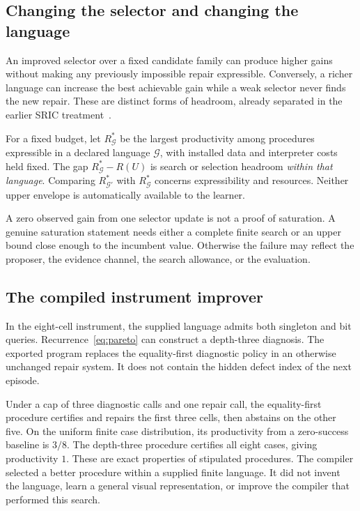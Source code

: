 \documentclass[11pt,letterpaper]{article}
\theoremstyle{plain}
\theoremstyle{definition}
\begin{document}
\subsection{Changing the selector and changing the language}
An improved selector over a fixed candidate family can produce higher gains without making any previously impossible repair expressible. Conversely, a richer language can increase the best achievable gain while a weak selector never finds the new repair. These are distinct forms of headroom, already separated in the earlier SRIC treatment~\cite{sric}.

For a fixed budget, let $R^*_{\mathcal G}$ be the largest productivity among procedures expressible in a declared language $\mathcal G$, with installed data and interpreter costs held fixed. The gap $R^*_{\mathcal G}-R(U)$ is search or selection headroom \emph{within that language}. Comparing $R^*_{\mathcal G'}$ with $R^*_{\mathcal G}$ concerns expressibility and resources. Neither upper envelope is automatically available to the learner.

A zero observed gain from one selector update is not a proof of saturation. A genuine saturation statement needs either a complete finite search or an upper bound close enough to the incumbent value. Otherwise the failure may reflect the proposer, the evidence channel, the search allowance, or the evaluation.

\subsection{The compiled instrument improver}
In the eight-cell instrument, the supplied language admits both singleton and bit queries. Recurrence~\eqref{eq:pareto} can construct a depth-three diagnosis. The exported program replaces the equality-first diagnostic policy in an otherwise unchanged repair system. It does not contain the hidden defect index of the next episode.

Under a cap of three diagnostic calls and one repair call, the equality-first procedure certifies and repairs the first three cells, then abstains on the other five. On the uniform finite case distribution, its productivity from a zero-success baseline is $3/8$. The depth-three procedure certifies all eight cases, giving productivity $1$. These are exact properties of stipulated procedures. The compiler selected a better procedure within a supplied finite language. It did not invent the language, learn a general visual representation, or improve the compiler that performed this search.
\end{document}
